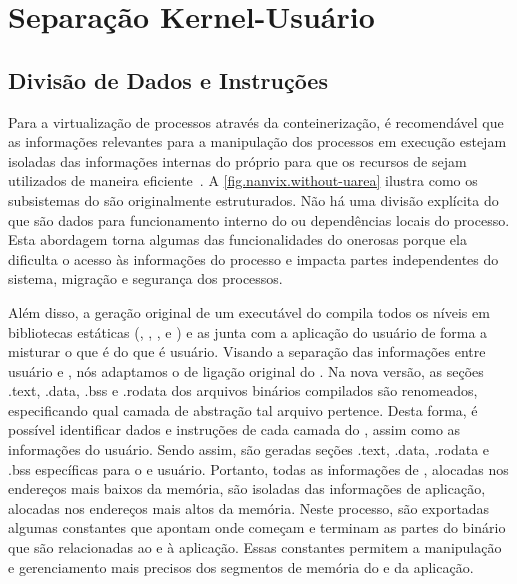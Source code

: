 \section{Separação Kernel-Usuário}
\label{sec.dev.kernel-usuario}

\subsection{Divisão de Dados e Instruções}
\label{sec.divisao-dados-instrucao}

    Para a virtualização de processos através da conteinerização, é recomendável que as informações relevantes para a manipulação dos processos em execução estejam isoladas das informações internas do próprio \os para que os recursos de \hardware sejam utilizados de maneira eficiente~\cite{choudhary2017critical}.
    A \autoref{fig.nanvix.without-uarea} ilustra como os subsistemas do \nanvix são originalmente estruturados. Não há uma divisão explícita do que são dados para funcionamento interno do \os ou dependências locais do processo.
    Esta abordagem torna algumas das funcionalidades do \os onerosas porque ela dificulta o acesso às informações do processo e impacta partes independentes do sistema, \eg migração e segurança dos processos.

    Além disso, a geração original de um executável do \nanvix compila todos os níveis em bibliotecas estáticas (\hal, \microkernel, \libnanvix, \ulibc e \multikernel) e as junta com a aplicação do usuário de forma a misturar o que é  do que é usuário.
    Visando a separação das informações entre usuário e , nós adaptamos o \script de ligação original do \nanvix. Na nova versão, as seções .text, .data, .bss e .rodata dos arquivos binários compilados são renomeados, especificando qual camada de abstração tal arquivo pertence. Desta forma, é possível identificar dados e instruções de cada camada do \nanvix, assim como as informações do usuário. Sendo assim, são geradas seções .text, .data, .rodata e .bss específicas para o  e usuário. Portanto, todas as informações de , alocadas nos endereços mais baixos da memória, são isoladas das informações de aplicação, alocadas nos endereços mais altos da memória. Neste processo, são exportadas algumas constantes que apontam onde começam e terminam as partes do binário que são relacionadas ao  e à aplicação. Essas constantes permitem a manipulação e gerenciamento mais precisos dos segmentos de memória do  e da aplicação.
    
